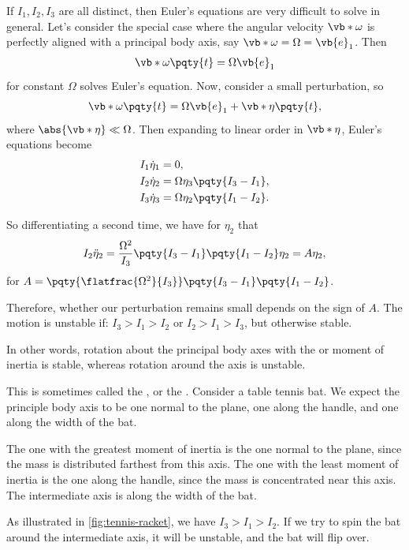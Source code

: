 If \(I_1, I_2, I_3\) are all distinct, then Euler's equations are very difficult to solve in general. Let's consider the special case where the angular velocity \(\vb*{\omega}\) is perfectly aligned with a principal body axis, say \(\vb*{\omega} = \Omega = \vb{e}_1\). Then
\begin{align*}
    \vb*{\omega} \pqty{t} = \Omega \vb{e}_1
\end{align*}
for constant \(\Omega\) solves Euler's equation. Now, consider a small perturbation, so
\begin{equation}
    \vb*{\omega} \pqty{t} = \Omega \vb{e}_1 + \vb*{\eta}\pqty{t},
\end{equation}
where \(\abs{\vb*{\eta}} \ll \Omega\). Then expanding to linear order in \(\vb*{\eta}\), Euler's equations become
\begin{subequations}
    \begin{align}
        I_1 \dot{\eta}_1 &= 0, \\
        I_2 \dot{\eta}_2 &= \Omega \eta_3 \pqty{I_3 - I_1}, \\
        I_3 \dot{\eta}_3 &= \Omega \eta_2 \pqty{I_1 - I_2}.
    \end{align}
\end{subequations}

So differentiating a second time, we have for \(\eta_2\) that
\begin{equation}
    I_2 \ddot{\eta}_2 = \frac{\Omega^2}{I_3} \pqty{I_3 - I_1} \pqty{I_1 - I_2} \eta_2 = A \eta_2,
\end{equation}
for \(A = \pqty{\flatfrac{\Omega^2}{I_3}} \pqty{I_3 - I_1} \pqty{I_1 - I_2}\).

Therefore, whether our perturbation remains small depends on the sign of \(A\). The motion is unstable if: \(I_3 > I_1 > I_2\) or \(I_2 > I_1 > I_3\), but otherwise stable.

In other words, rotation about the principal body axes with the  or  moment of inertia is stable, whereas rotation around the  axis is unstable.

\begin{example}
    This is sometimes called the , or the . Consider a table tennis bat. We expect the principle body axis to be one normal to the plane, one along the handle, and one along the width of the bat.

    The one with the greatest moment of inertia is the one normal to the plane, since the mass is distributed farthest from this axis. The one with the least moment of inertia is the one along the handle, since the mass is concentrated near this axis. The intermediate axis is along the width of the bat.

    As illustrated in \autoref{fig:tennis-racket}, we have \(I_3 > I_1 > I_2\). If we try to spin the bat around the intermediate axis, it will be unstable, and the bat will flip over.
\end{example}

